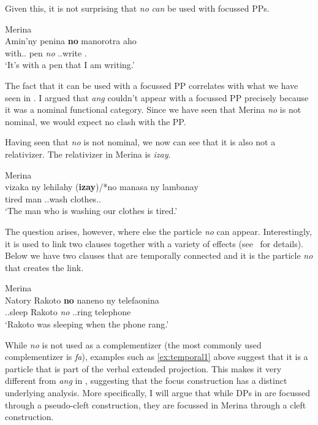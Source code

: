 \documentclass[output=paper]{langsci/langscibook}
\begin{document}
Given this, it is not surprising that \emph{no} \emph{can} be used with
focussed PPs.

\ea Merina\\
	\gll Amin'ny penina \textbf{no} manorotra aho\\
    with.\Gen{}.\Det{} pen \emph{no} \Prs.\At{}.write \Fsg{}.\Nom{}\\
    \glt `It's with a pen that I am writing.'
\z

The fact that it can be used with a focussed PP correlates with what we have
seen in .  I argued that \emph{ang} couldn't appear with a focussed PP
precisely because it was a nominal functional category.  Since we have seen
that Merina \emph{no} is not nominal, we would expect no clash with the PP.

Having seen that \emph{no} is not nominal, we now can see that it is also not a
relativizer.  The relativizer in Merina is \emph{izay}.

\ea Merina\\
	\gll  vizaka ny lehilahy (\textbf{izay})/*no manasa ny lambanay\\
    tired  \Det{} man \hphantom{(}\Rel{} \Prs.\At{}.wash \Det{} clothes.\Fpl.\Excl{}\\
    \glt `The man who is washing our clothes is tired.'
\z

The question arises, however, where else the particle \emph{no} can appear.
Interestingly, it is used to link two clauses together with a variety of
effects (see~\citealt{Pearson:2009a} for details).  Below we have two clauses
that are temporally connected and it is the particle \emph{no} that creates the
link.

\ea Merina\\
	\gll Natory Rakoto \textbf{no} naneno ny telefaonina\label{ex:temporal1} \\
    \Pst.\At{}.sleep Rakoto \emph{no} \Pst.\At{}.ring \Det{} telephone\\
    \glt `Rakoto was sleeping when the phone rang.'
\z

While \emph{no} is not used as a complementizer (the most commonly used
complementizer is \emph{fa}), examples such as \eqref{ex:temporal1} above
suggest that it is a particle that is part of the verbal extended projection.
This makes it very different from \emph{ang} in , suggesting that
the focus construction has a distinct underlying analysis.  More specifically,
I will argue that while  DPs in  are focussed through a
pseudo-cleft construction, they are focussed in Merina through a cleft
construction.
\end{document}
